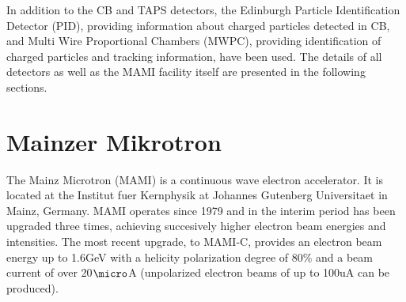 In addition to the CB and TAPS detectors, the Edinburgh Particle Identification Detector (PID), providing information about charged particles detected in CB, and Multi Wire Proportional Chambers (MWPC), providing identification of charged particles and tracking information, have been used. The details of all detectors as well as the MAMI facility itself are presented in the following sections.

\section{Mainzer Mikrotron}

\indent The Mainz Microtron (MAMI) is a continuous wave electron accelerator. It is located at the Institut fuer Kernphysik at Johannes Gutenberg Universitaet in Mainz, Germany. MAMI operates since 1979 and in the interim period has been upgraded three times, achieving succesively higher electron beam energies and intensities. The most recent upgrade, to MAMI-C, provides an  electron beam energy up to 1.6GeV with a helicity polarization degree of 80\% and a beam current of over 20$\micro$A (unpolarized electron beams of up to 100uA can be produced).


